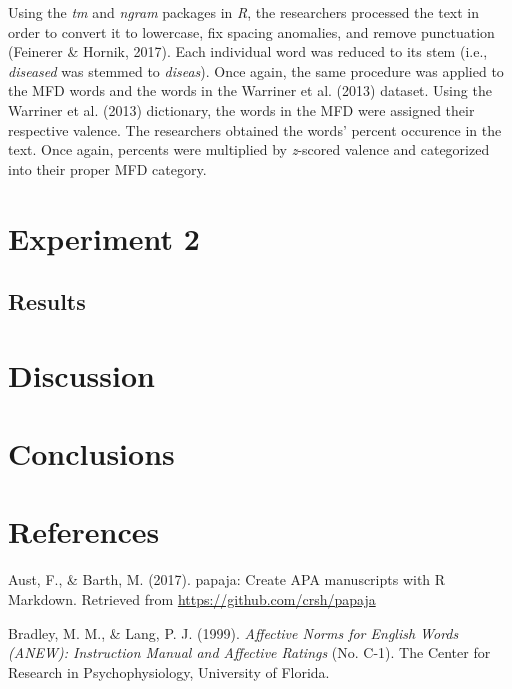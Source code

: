\documentclass[,man]{apa6}
\begin{document}
Using the \emph{tm} and \emph{ngram} packages in \emph{R}, the
researchers processed the text in order to convert it to lowercase, fix
spacing anomalies, and remove punctuation (Feinerer \& Hornik, 2017).
Each individual word was reduced to its stem (i.e., \emph{diseased} was
stemmed to \emph{diseas}). Once again, the same procedure was applied to
the MFD words and the words in the Warriner et al. (2013) dataset. Using
the Warriner et al. (2013) dictionary, the words in the MFD were
assigned their respective valence. The researchers obtained the words'
percent occurence in the text. Once again, percents were multiplied by
\emph{z}-scored valence and categorized into their proper MFD category.

\section{Experiment 2}\label{experiment-2-1}

\subsection{Results}\label{results-1}

\section{Discussion}\label{discussion-1}

\section{Conclusions}\label{conclusions}

\newpage

\section{References}\label{references}

\begingroup
\setlength{\parindent}{-0.5in} \setlength{\leftskip}{0.5in}

\hypertarget{refs}{}
\hypertarget{ref-Aust2017}{}
Aust, F., \& Barth, M. (2017). papaja: Create APA manuscripts with R
Markdown. Retrieved from \url{https://github.com/crsh/papaja}

\hypertarget{ref-Bradley1999}{}
Bradley, M. M., \& Lang, P. J. (1999). \emph{Affective Norms for English
Words (ANEW): Instruction Manual and Affective Ratings} (No. C-1). The
Center for Research in Psychophysiology, University of Florida.
\end{document}
